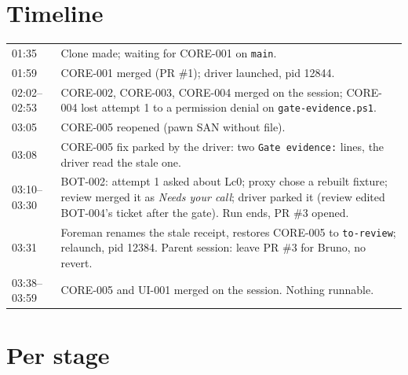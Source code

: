 \documentclass[11pt,a4paper]{article}
\begin{document}
\section*{Timeline}

\begin{tabularx}{\linewidth}{@{}lX@{}}
\toprule
01:35 & Clone made; waiting for CORE-001 on \texttt{main}. \\
01:59 & CORE-001 merged (PR \#1); driver launched, pid 12844. \\
02:02--02:53 & CORE-002, CORE-003, CORE-004 merged on the session; CORE-004 lost attempt 1 to a permission denial on \texttt{gate-evidence.ps1}. \\
03:05 & CORE-005 reopened (pawn SAN without file). \\
03:08 & CORE-005 fix parked by the driver: two \texttt{Gate evidence:} lines, the driver read the stale one. \\
03:10--03:30 & BOT-002: attempt 1 asked about Lc0; proxy chose a rebuilt fixture; review merged it as \emph{Needs your call}; driver parked it (review edited BOT-004's ticket after the gate). Run ends, PR \#3 opened. \\
03:31 & Foreman renames the stale receipt, restores CORE-005 to \texttt{to-review}; relaunch, pid 12384. Parent session: leave PR \#3 for Bruno, no revert. \\
03:38--03:59 & CORE-005 and UI-001 merged on the session. Nothing runnable. \\
\bottomrule
\end{tabularx}

\section*{Per stage}
\end{document}
